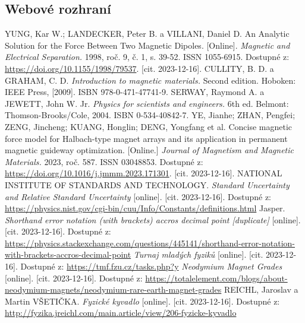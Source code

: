 \documentclass[12pt, a4paper,
 twoside,        %
 openright
]{report}
\begin{document}
\subsection{Webové rozhraní}

\begin{thebibliography}{99}
     YUNG, Kar W.; LANDECKER, Peter B. a VILLANI, Daniel D. An Analytic Solution for the Force Between Two Magnetic Dipoles. [Online]. \textit{Magnetic and Electrical Separation.} 1998, roč. 9, č. 1, s. 39-52. ISSN 1055-6915. Dostupné z: \url{https://doi.org/10.1155/1998/79537}. [cit. 2023-12-16].
     CULLITY, B. D. a GRAHAM, C. D. \textit{Introduction to magnetic materials.} Second edition. Hoboken: IEEE Press, [2009]. ISBN 978-0-471-47741-9.
     SERWAY, Raymond A. a JEWETT, John W. Jr. \textit{Physics for scientists and engineers.} 6th ed. Belmont: Thomson-Brooks/Cole, 2004. ISBN 0-534-40842-7.
     YE, Jianhe; ZHAN, Pengfei; ZENG, Jincheng; KUANG, Honglin; DENG, Yongfang et al. Concise magnetic force model for Halbach-type magnet arrays and its application in permanent magnetic guideway optimization. [Online.] \textit{Journal of Magnetism and Magnetic Materials.} 2023, roč. 587. ISSN 03048853. Dostupné z: \url{https://doi.org/10.1016/j.jmmm.2023.171301}. [cit. 2023-12-16].
     NATIONAL INSTITUTE OF STANDARDS AND TECHNOLOGY. \textit{Standard Uncertainty and Relative Standard Uncertainty} [online]. [cit. 2023-12-16]. Dostupné z: \url{https://physics.nist.gov/cgi-bin/cuu/Info/Constants/definitions.html}
     Jasper. \textit{Shorthand error notation (with brackets) accros decimal point [duplicate]} [online]. [cit. 2023-12-16]. Dostupné z: \url{https://physics.stackexchange.com/questions/445141/shorthand-error-notation-with-brackets-accros-decimal-point}
     \textit{Turnaj mladých fyziků} [online]. [cit. 2023-12-16]. Dostupné z: \url{https://tmf.fzu.cz/tasks.php?y}
     \textit{Neodymium Magnet Grades} [online]. [cit. 2023-12-16]. Dostupné z: \url{https://totalelement.com/blogs/about-neodymium-magnets/neodymium-rare-earth-magnet-grades}
     REICHL, Jaroslav a Martin VŠETIČKA. \textit{Fyzické kyvadlo} [online]. [cit. 2023-12-16]. Dostupné z: \url{http://fyzika.jreichl.com/main.article/view/206-fyzicke-kyvadlo}



\end{thebibliography}
\end{document}
